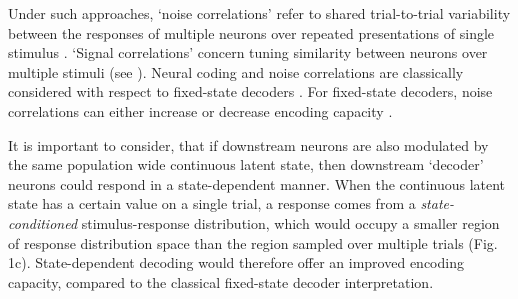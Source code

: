 \documentclass{article}
\begin{document}
Under such approaches, `noise correlations' refer to shared trial-to-trial variability between the responses of multiple neurons over repeated presentations of single stimulus \cite{averbeck2006neural}. `Signal correlations' concern tuning similarity between neurons over multiple stimuli (see \cite{averbeck2006neural}). Neural coding and noise correlations are classically considered with respect to fixed-state decoders \cite{averbeck2006neural, moreno2014information, stringer2019high}. For fixed-state decoders, noise correlations can either increase or decrease encoding capacity \cite{averbeck2006neural}.


It is important to consider, that if downstream neurons are also modulated by the same population wide continuous latent state, then downstream `decoder' neurons could respond in a state-dependent manner.
When the continuous latent state has a certain value on a single trial, a response comes from a \textit{state-conditioned} stimulus-response distribution, which would occupy a smaller region of response distribution space than the region sampled over multiple trials (Fig. 1c). State-dependent decoding would therefore offer an improved encoding capacity, compared to the classical fixed-state decoder interpretation.



\end{document}
